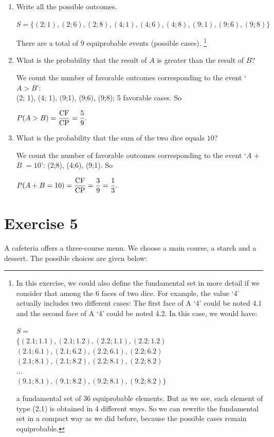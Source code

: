 \documentclass[12pt,thmsa]{article}
\begin{document}
\begin{enumerate} %
\item Write all the possible outcomes.
\begin{center} $S=\{(2;1),(2;6),(2;8),(4;1),(4;6),(4;8),(9;1),(9;6),(9;8)\}$
\end{center}
There are a total of 9 equiprobable events (possible cases). \footnote{In this exercise, we could also define the fundamental set in more detail if we consider that among the 6 faces of two dice. For example, the value `4' actually includes two different cases: The first face of A `4' could be noted 4.1 and the second face of A `4' could be noted 4.2. In this case, we would have:
\begin{center} 
$S = $ \\ $ \{(2.1;1.1),(2.1;1.2),(2.2;1.1),(2.2;1.2)$\\$(2.1;6.1),(2.1;6.2),(2.2;6.1),(2.2;6.2)$\\$(2.1;8.1),(2.1;8.2)
,(2.2;8.1),(2.2;8.2)$\\$...$\\$(9.1;8.1),(9.1;8.2),(9.2;8.1),(9.2;8.2)\}$
\end{center}
a fundamental set of 36 equiprobable elements. But as we see, each element of type (2,1) is obtained in 4 different ways. So we can rewrite the fundamental set in a compact way as we did before, because the possible cases remain equiprobable.}


\item What is the probability that the result of $A$ is greater than the result of $B$?

We count the number of favorable outcomes corresponding to the event  `$A> B$':\\ 
(2; 1), (4; 1), (9;1), (9;6), (9;8); 5 favorable cases. So
\begin{center} $P(A>B)=\displaystyle \frac{\rm CF}{\rm CP}=\frac{5}{9}.$
\end{center}


\item What is the probability that the sum of the two dice equals $10$?


We count the number of favorable outcomes corresponding to the event  `$A$ + $B$ $= 10$':
 (2;8), (4;6), (9;1). So 
\begin{center} $P(A+B=10)=\displaystyle \frac{\rm CF}{\rm CP}=\frac{3}{9}=\frac{1}{3}.$
\end{center}
\end{enumerate}


\section*{Exercise 5}
A cafeteria offers a three-course menu. We choose a main course, a starch and a
dessert. The possible choices are given below:
\end{document}
